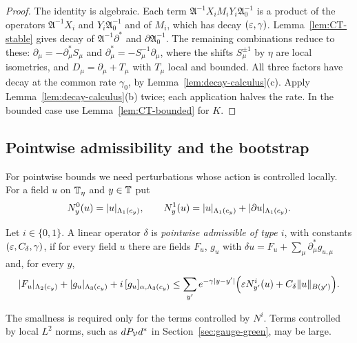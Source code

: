 \begin{proof}
The identity is algebraic. Each term $\mathfrak A^{-1}X_iM_iY_i\mathfrak A_0^{-1}$ is a product of the operators $\mathfrak A^{-1}X_i$ and $Y_i\mathfrak A_0^{-1}$ and of $M_i$, which has decay $(\varepsilon,\gamma)$. Lemma~\ref{lem:CT-stable} gives decay of $\mathfrak A^{-1}\partial^*$ and $\partial\mathfrak A_0^{-1}$. The remaining combinations reduce to these: $\partial_\mu=-\partial^*_\mu S_\mu$ and $\partial^*_\mu=-S_\mu^{-1}\partial_\mu$, where the shifts $S_\mu^{\pm1}$ by $\eta$ are local isometries, and $D_\mu=\partial_\mu+T_\mu$ with $T_\mu$ local and bounded. All three factors have decay at the common rate $\gamma_0$, by Lemma~\ref{lem:decay-calculus}(c). Apply Lemma~\ref{lem:decay-calculus}(b) twice; each application halves the rate. In the bounded case use Lemma~\ref{lem:CT-bounded} for $K$.
\end{proof}

\subsection{Pointwise admissibility and the bootstrap}

For pointwise bounds we need perturbations whose action is controlled locally. For a field $u$ on $\mathbb T_\eta$ and $y\in\mathbb T$ put
\[
N^0_y(u)=|u|_{\Lambda_1(c_y)},\qquad N^1_y(u)=|u|_{\Lambda_1(c_y)}+|\partial u|_{\Lambda_1(c_y)} .
\]

\begin{definition}\label{def:pointwise-admissible}
Let $i\in\{0,1\}$. A linear operator $\delta$ is \emph{pointwise admissible of type $i$}, with constants $(\varepsilon,C_\delta,\gamma)$, if for every field $u$ there are fields $F_u$, $g_u$ with $\delta u=F_u+\sum_\mu\partial^*_\mu g_{u,\mu}$ and, for every $y$,
\[
|F_u|_{\Lambda_2(c_y)}+|g_u|_{\Lambda_3(c_y)}+i\,[g_u]_{\alpha,\Lambda_3(c_y)}\le\sum_{y'}e^{-\gamma|y-y'|}\Big(\varepsilon N^i_{y'}(u)+C_\delta\|u\|_{B(y')}\Big).
\]
\end{definition}

The smallness is required only for the terms controlled by $N^i$. Terms controlled by local $L^2$ norms, such as $dP_\mathcal V d^*$ in Section~\ref{sec:gauge-green}, may be large.

